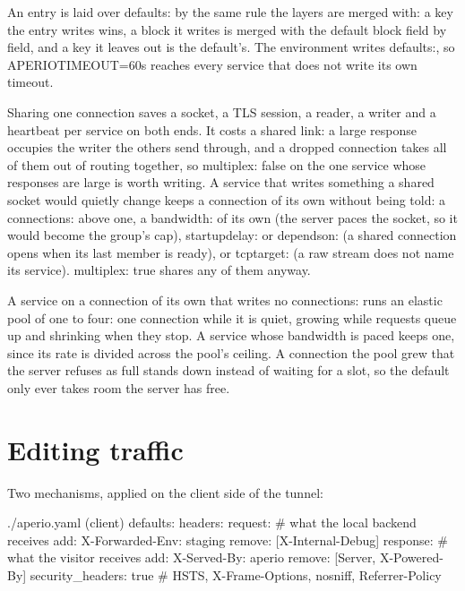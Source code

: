 \documentclass[11pt,a4paper,oneside]{book}
\newcommand{\aperiobreakableunderscore}{\textunderscore\allowbreak}
\newcommand{\aperiocodebreaks}{\XeTeXinterchartokenstate=1 }
\newcommand{\aperiocodebreaks}{}
\DeclareRobustCommand{\code}[1]{{\ttfamily\small\aperiocodebreaks
  \let\_\aperiobreakableunderscore#1}}
\begin{document}
An entry is laid over \code{defaults:} by the same rule the layers are
merged with: a key the entry writes wins, a block it writes is merged with
the default block field by field, and a key it leaves out is the default's.
The environment writes \code{defaults:}, so \code{APERIO\_TIMEOUT=60s}
reaches every service that does not write its own \code{timeout}.

Sharing one connection saves a socket, a TLS session, a reader, a writer
and a heartbeat per service on both ends. It costs a shared link: a large
response occupies the writer the others send through, and a dropped
connection takes all of them out of routing together, so
\code{multiplex: false} on the one service whose responses are large is
worth writing. A service that writes something a shared socket would
quietly change keeps a connection of its own without being told: a
\code{connections:} above one, a \code{bandwidth:} of its own (the server
paces the socket, so it would become the group's cap),
\code{startup\_delay:} or \code{depends\_on:} (a shared connection opens
when its last member is ready), or \code{tcp\_target:} (a raw stream does
not name its service). \code{multiplex: true} shares any of them anyway.

A service on a connection of its own that writes no \code{connections:}
runs an elastic pool of one to four: one connection while it is quiet,
growing while requests queue up and shrinking when they stop. A service
whose bandwidth is paced keeps one, since its rate is divided across the
pool's ceiling. A connection the pool grew that the server refuses as
full stands down instead of waiting for a slot, so the default only ever
takes room the server has free.

\section{Editing traffic}

Two mechanisms, applied on the client side of the tunnel:

\begin{codecard}[aperioyaml]{./aperio.yaml (client)}
defaults:
  headers:
    request:                     # what the local backend receives
      add:
        X-Forwarded-Env: staging
      remove: [X-Internal-Debug]
    response:                    # what the visitor receives
      add:
        X-Served-By: aperio
      remove: [Server, X-Powered-By]
  security_headers: true         # HSTS, X-Frame-Options, nosniff, Referrer-Policy
\end{codecard}
\end{document}
